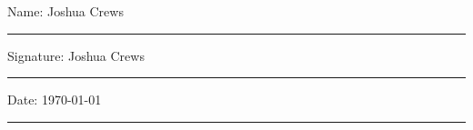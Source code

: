 \documentclass[11pt,oneside]{book}
\begin{document}
\noindent Name: Joshua Crews\\[1mm]
\rule[1em]{25em}{0.5pt}

\noindent Signature: Joshua Crews\\[1mm]
\rule[1em]{25em}{0.5pt}

\noindent Date: \today\\[1mm]
\rule[1em]{25em}{0.5pt}








\tableofcontents
\listoffigures
\listoftables


\mainmatter












\begin{appendices}

\end{appendices}
\end{document}
